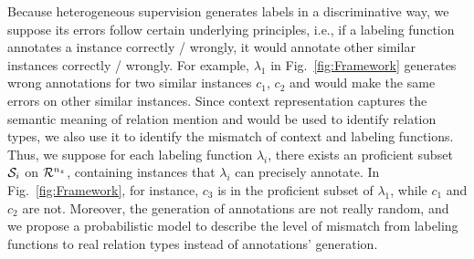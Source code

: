 Because heterogeneous supervision generates labels in a discriminative way, we suppose its errors follow certain underlying principles, i.e., if a labeling function annotates a instance correctly / wrongly, it would annotate other similar instances correctly / wrongly. 
For example, $\lambda_1$ in Fig.~\ref{fig:Framework} generates wrong annotations for two similar instances $c_1$, $c_2$ and would make the same errors on other similar instances.
Since context representation captures the semantic meaning of relation mention and would be used to identify relation types, we also use it to identify the mismatch of context and labeling functions. 
Thus, we suppose for each labeling function $\lambda_i$, there exists an proficient subset $\S_i$ on $\R^{n_z}$, containing instances that $\lambda_i$ can precisely annotate. 
In Fig.~\ref{fig:Framework}, for instance, $c_3$ is in the proficient subset of $\lambda_1$, while $c_1$ and $c_2$ are not.
Moreover, the generation of annotations are not really random, and we propose a probabilistic model to describe the level of mismatch from labeling functions to real relation types instead of annotations' generation.


